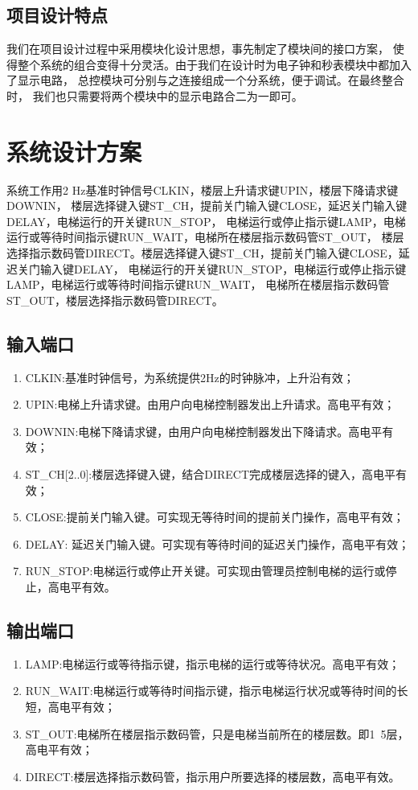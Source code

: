 \documentclass[UTF8]{article}
\begin{document}
\subsection{项目设计特点}
我们在项目设计过程中采用模块化设计思想，事先制定了模块间的接口方案，
使得整个系统的组合变得十分灵活。由于我们在设计时为电子钟和秒表模块中都加入了显示电路，
总控模块可分别与之连接组成一个分系统，便于调试。在最终整合时，
我们也只需要将两个模块中的显示电路合二为一即可。


\section{系统设计方案}
系统工作用2 Hz基准时钟信号CLKIN，楼层上升请求键UPIN，楼层下降请求键DOWNIN，
楼层选择键入键ST\_CH，提前关门输入键CLOSE，延迟关门输入键DELAY，电梯运行的开关键RUN\_STOP，
电梯运行或停止指示键LAMP，电梯运行或等待时间指示键RUN\_WAIT，电梯所在楼层指示数码管ST\_OUT，
楼层选择指示数码管DIRECT。楼层选择键入键ST\_CH，提前关门输入键CLOSE，延迟关门输入键DELAY，
电梯运行的开关键RUN\_STOP，电梯运行或停止指示键LAMP，电梯运行或等待时间指示键RUN\_WAIT，
电梯所在楼层指示数码管ST\_OUT，楼层选择指示数码管DIRECT。
\subsection{输入端口}
\begin{enumerate}
\item CLKIN:基准时钟信号，为系统提供2Hz的时钟脉冲，上升沿有效；
\item UPIN:电梯上升请求键。由用户向电梯控制器发出上升请求。高电平有效；
\item DOWNIN:电梯下降请求键，由用户向电梯控制器发出下降请求。高电平有效；
\item ST\_CH[2..0]:楼层选择键入键，结合DIRECT完成楼层选择的键入，高电平有效；
\item CLOSE:提前关门输入键。可实现无等待时间的提前关门操作，高电平有效；
\item DELAY:	延迟关门输入键。可实现有等待时间的延迟关门操作，高电平有效；
\item RUN\_STOP:电梯运行或停止开关键。可实现由管理员控制电梯的运行或停止，高电平有效。
\end{enumerate}
\subsection{输出端口}
\begin{enumerate}
\item LAMP:电梯运行或等待指示键，指示电梯的运行或等待状况。高电平有效；
\item RUN\_WAIT:电梯运行或等待时间指示键，指示电梯运行状况或等待时间的长短，高电平有效；
\item ST\_OUT:电梯所在楼层指示数码管，只是电梯当前所在的楼层数。即1~5层，高电平有效；
\item DIRECT:楼层选择指示数码管，指示用户所要选择的楼层数，高电平有效。
\end{enumerate}
\end{document}
